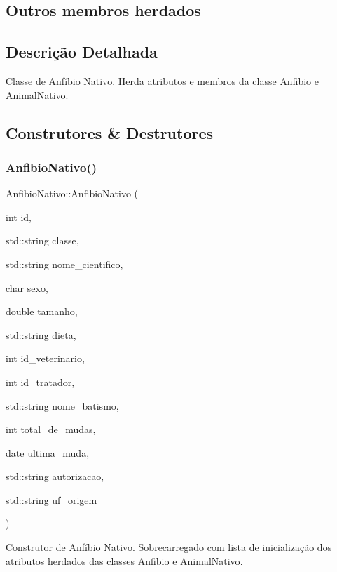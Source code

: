 \subsection*{Outros membros herdados}


\subsection{Descrição Detalhada}
Classe de Anfíbio Nativo. Herda atributos e membros da classe \hyperlink{classAnfibio}{Anfibio} e \hyperlink{classAnimalNativo}{Animal\+Nativo}. 

\subsection{Construtores \& Destrutores}
\mbox{\label{classAnfibioNativo_a91cf2d5da4dc6fb39d63098a82ccc94a}} 
\subsubsection{\texorpdfstring{Anfibio\+Nativo()}{AnfibioNativo()}}
{\footnotesize\ttfamily Anfibio\+Nativo\+::\+Anfibio\+Nativo (\begin{DoxyParamCaption}\item[{int}]{id,  }\item[{std\+::string}]{classe,  }\item[{std\+::string}]{nome\+\_\+cientifico,  }\item[{char}]{sexo,  }\item[{double}]{tamanho,  }\item[{std\+::string}]{dieta,  }\item[{int}]{id\+\_\+veterinario,  }\item[{int}]{id\+\_\+tratador,  }\item[{std\+::string}]{nome\+\_\+batismo,  }\item[{int}]{total\+\_\+de\+\_\+mudas,  }\item[{\hyperlink{classdate}{date}}]{ultima\+\_\+muda,  }\item[{std\+::string}]{autorizacao,  }\item[{std\+::string}]{uf\+\_\+origem }\end{DoxyParamCaption})}

Construtor de Anfíbio Nativo. Sobrecarregado com lista de inicialização dos atributos herdados das classes \hyperlink{classAnfibio}{Anfibio} e \hyperlink{classAnimalNativo}{Animal\+Nativo}. \mbox{\label{classAnfibioNativo_a10ecde482410d669995fd852ba150d75}} 
